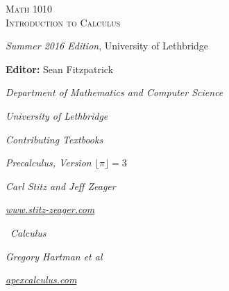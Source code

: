 
\hskip 125pt\begin{minipage}{\textwidth}
\begin{flushright}

\textsc{{\Huge Math 1010 \\
Introduction to Calculus}} \\

\bigskip

\textsl{\Large Summer 2016 Edition}, 
{\Large University of Lethbridge}\\


\bigskip

\Large
\vspace{1in}

\textbf{Editor:} Sean Fitzpatrick

\emph{\large Department of Mathematics and Computer Science}

\emph{\large University of Lethbridge}\vskip15pt

\parbox{200pt}{\textit{Contributing Textbooks}}\hskip 2cm \phantom{.}

\vspace{0.5in}

\textit{Precalculus, Version $\lfloor \pi\rfloor = 3$}

\emph{\large Carl Stitz and Jeff Zeager}

\emph{\large \href{http://www.stitz-zeager.com}{www.stitz-zeager.com}}\vskip 15pt

\apex\ \textit{Calculus}

\emph{\large Gregory Hartman et al}

\emph{\large \href{http://www.apexcalculus.com}{apexcalculus.com}}\vskip 15pt


\normalsize
\end{flushright}
\end{minipage}

